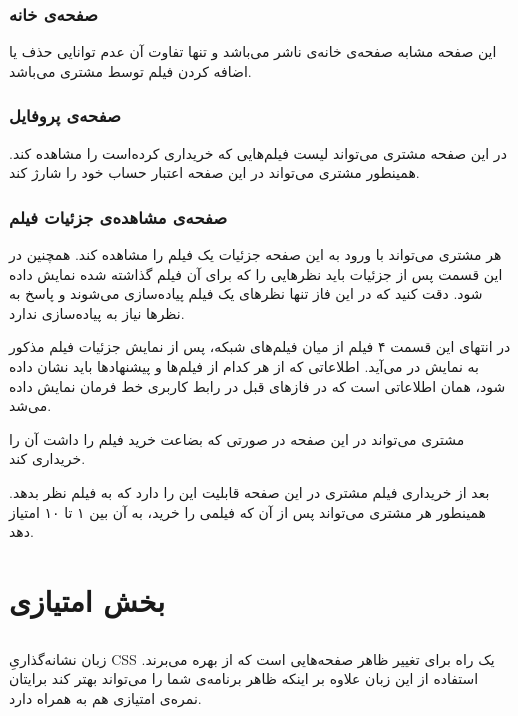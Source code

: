 \documentclass{utap}
\begin{document}
	
	
		\subsubsection{صفحه‌ی خانه}
	
	این صفحه مشابه صفحه‌ی خانه‌ی ناشر می‌باشد و تنها تفاوت آن عدم توانایی حذف یا اضافه کردن فیلم توسط مشتری می‌باشد. 
	
		\subsubsection{صفحه‌ی پروفایل}
		در این صفحه مشتری می‌تواند لیست فیلم‌هایی که خریداری کرده‌است را مشاهده کند. همینطور مشتری می‌تواند در این صفحه اعتبار حساب خود را شارژ کند. 
	
		\subsubsection{صفحه‌ی مشاهده‌ی جزئیات فیلم }
		
		هر مشتری می‌تواند با ورود به این صفحه جزئیات یک فیلم را مشاهده کند. همچنین در این قسمت پس از جزئیات باید نظرهایی را که برای آن فیلم گذاشته شده نمایش داده شود. دقت کنید که در این فاز تنها نظر‌های یک فیلم پیاده‌سازی می‌شوند و پاسخ به نظر‌ها نیاز به پیاده‌سازی ندارد.
		
		در  انتهای این قسمت ۴ فیلم از میان فیلم‌های شبکه، پس از نمایش جزئیات فیلم مذکور به نمایش در می‌آید. 
		اطلاعاتی که از هر کدام از فیلم‌ها و پیشنهاد‌ها باید نشان داده شود، همان اطلاعاتی است که در فاز‌های قبل در رابط کاربری خط فرمان نمایش داده می‌شد.
		
		مشتری می‌تواند در این صفحه در صورتی که بضاعت خرید فیلم را داشت آن‌ را خریداری کند. 
		
		بعد از خریداری فیلم مشتری در این صفحه قابلیت این را دارد که به فیلم نظر بدهد. همینطور هر مشتری می‌تواند پس از آن‌ که فیلمی را خرید، به آن بین ۱ تا ۱۰ امتیاز دهد. 
	
	
	
	
	
	
	
	
	\section{بخش امتیازی}
		\subsection{}
	زبان نشانه‌گذاریِ 
CSS
 یک راه برای تغییر ظاهر صفحه‌هایی است که از  بهره می‌برند. استفاده از این زبان علاوه بر اینکه ظاهر برنامه‌ی شما را می‌تواند بهتر کند برایتان نمره‌ی امتیازی هم به همراه دارد.
 
\end{document}
